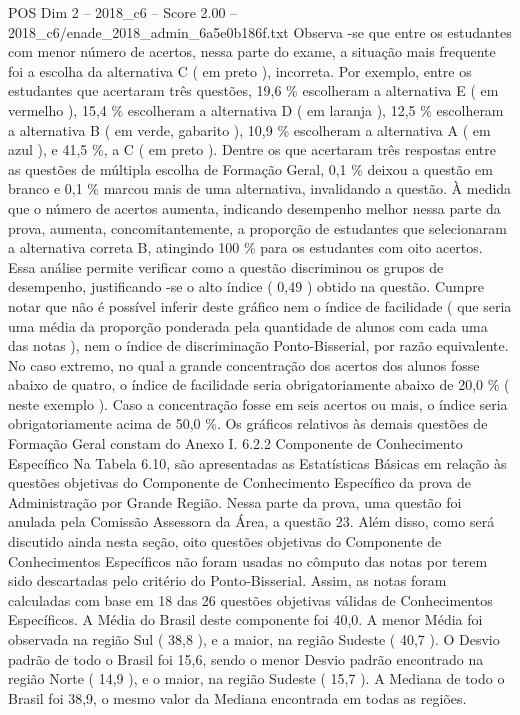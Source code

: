 \begin{textsample}{POS Dim 2 – 2018\_c6 – Score 2.00 – 2018\_c6/enade\_2018\_admin\_6a5e0b186f.txt}
Observa -se que entre os estudantes com menor número de acertos, nessa parte do exame, a situação mais frequente foi a escolha da alternativa C ( em preto ), incorreta.
Por exemplo, entre os estudantes que acertaram três questões, 19,6 \% escolheram a alternativa E ( em vermelho ), 15,4 \% escolheram a alternativa D ( em laranja ), 12,5 \% escolheram a alternativa B ( em verde, gabarito ), 10,9 \% escolheram a alternativa A ( em azul ), e 41,5 \%, a C ( em preto ).
Dentre os que acertaram três respostas entre as questões de múltipla escolha de Formação Geral, 0,1 \% deixou a questão em branco e 0,1 \% marcou mais de uma alternativa, invalidando a questão.
À medida que o número de acertos aumenta, indicando desempenho melhor nessa parte da prova, aumenta, concomitantemente, a proporção de estudantes que selecionaram a alternativa correta B, atingindo 100 \% para os estudantes com oito acertos.
Essa análise permite verificar como a questão discriminou os grupos de desempenho, justificando -se o alto índice ( 0,49 ) obtido na questão.
Cumpre notar que não é possível inferir deste gráfico nem o índice de facilidade ( que seria uma média da proporção ponderada pela quantidade de alunos com cada uma das notas ), nem o índice de discriminação Ponto-Bisserial, por razão equivalente.
No caso extremo, no qual a grande concentração dos acertos dos alunos fosse abaixo de quatro, o índice de facilidade seria obrigatoriamente abaixo de 20,0 \% ( neste exemplo ).
Caso a concentração fosse em seis acertos ou mais, o índice seria obrigatoriamente acima de 50,0 \%.
Os gráficos relativos às demais questões de Formação Geral constam do Anexo I. 6.2.2 Componente de Conhecimento Específico Na Tabela 6.10, são apresentadas as Estatísticas Básicas em relação às questões objetivas do Componente de Conhecimento Específico da prova de Administração por Grande Região.
Nessa parte da prova, uma questão foi anulada pela Comissão Assessora da Área, a questão 23.
Além disso, como será discutido ainda nesta seção, oito questões objetivas do Componente de Conhecimentos Específicos não foram usadas no cômputo das notas por terem sido descartadas pelo critério do Ponto-Bisserial.
Assim, as notas foram calculadas com base em 18 das 26 questões objetivas válidas de Conhecimentos Específicos.
A Média do Brasil deste componente foi 40,0.
A menor Média foi observada na região Sul ( 38,8 ), e a maior, na região Sudeste ( 40,7 ).
O Desvio padrão de todo o Brasil foi 15,6, sendo o menor Desvio padrão encontrado na região Norte ( 14,9 ), e o maior, na região Sudeste ( 15,7 ).
A Mediana de todo o Brasil foi 38,9, o mesmo valor da Mediana encontrada em todas as regiões.

\end{textsample}

